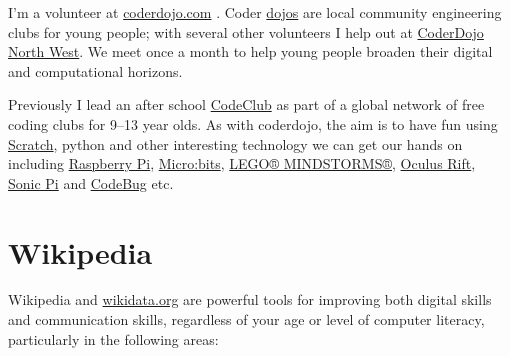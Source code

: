 \documentclass[
  12pt,
]{book}
\begin{document}
I'm a volunteer at \href{https://coderdojo.com/}{coderdojo.com} \citep{coderdojo}. Coder \href{https://en.wikipedia.org/wiki/Dojo}{dojos} are local community engineering clubs for young people; with several other volunteers I help out at \href{https://twitter.com/coderdojonw}{CoderDojo North West}. We meet once a month to help young people broaden their digital and computational horizons.

Previously I lead an after school \href{https://codeclub.org}{CodeClub} as part of a global network of free coding clubs for 9--13 year olds. \citep{codeclub} As with coderdojo, the aim is to have fun using \href{https://scratch.mit.edu/}{Scratch}, \citep{Resnick2009} python and other interesting technology we can get our hands on including \href{https://www.raspberrypi.org/}{Raspberry Pi}, \citep{raspberrypi} \href{https://microbit.org/}{Micro:bits}, \citep{Sentance2017} \href{https://www.lego.com/en-gb/themes/mindstorms}{LEGO® MINDSTORMS®}, \citep{Papert1980, Klassner2003} \href{https://www.oculus.com}{Oculus Rift}, \href{https://sonic-pi.net/}{Sonic Pi} \citep{Aaron2016} and \href{http://www.codebug.org.uk/}{CodeBug} etc.

\hypertarget{wikipedia}{%
\section{Wikipedia}\label{wikipedia}}

Wikipedia and \href{https://www.wikidata.org}{wikidata.org} \citep{Vrandecic2014, Turki2019} are powerful tools for improving both digital skills and communication skills, regardless of your age or level of computer literacy, \citep{Proffitt2018, goodfaith, Littlejohn2019} particularly in the following areas:
\end{document}
